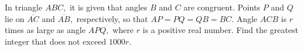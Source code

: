 In triangle $ABC,$ it is given that angles $B$ and $C$ are congruent. Points $P$ and $Q$ lie on $\overline{AC}$ and $\overline{AB},$ respectively, so that $AP=PQ=QB=BC.$ Angle $ACB$ is $r$ times as large as angle $APQ,$ where $r$ is a positive real number. Find the greatest integer that does not exceed $1000r.$